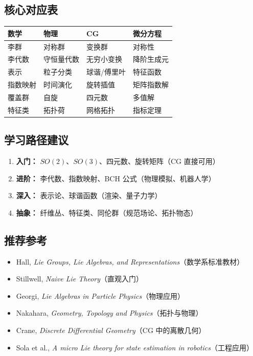 \subsection{核心对应表}

\begin{center}
\begin{tabular}{L{3cm}L{3cm}L{3cm}L{3cm}}
\toprule
\textbf{数学} & \textbf{物理} & \textbf{CG} & \textbf{微分方程} \\
\midrule
李群 & 对称群 & 变换群 & 对称性 \\
李代数 & 守恒量代数 & 无穷小变换 & 降阶生成元 \\
表示 & 粒子分类 & 球谐/傅里叶 & 特征函数 \\
指数映射 & 时间演化 & 旋转插值 & 矩阵指数解 \\
覆盖群 & 自旋 & 四元数 & 多值解 \\
特征类 & 拓扑荷 & 网格拓扑 & 指标定理 \\
\bottomrule
\end{tabular}
\end{center}

\subsection{学习路径建议}

\begin{enumerate}
  \item \textbf{入门：} $SO(2)$、$SO(3)$、四元数、旋转矩阵（CG 直接可用）
  \item \textbf{进阶：} 李代数、指数映射、BCH 公式（物理模拟、机器人学）
  \item \textbf{深入：} 表示论、球谐函数（渲染、量子力学）
  \item \textbf{抽象：} 纤维丛、特征类、同伦群（规范场论、拓扑物态）
\end{enumerate}

\subsection{推荐参考}

\begin{itemize}
  \item Hall, \textit{Lie Groups, Lie Algebras, and Representations}（数学系标准教材）
  \item Stillwell, \textit{Naive Lie Theory}（直观入门）
  \item Georgi, \textit{Lie Algebras in Particle Physics}（物理应用）
  \item Nakahara, \textit{Geometry, Topology and Physics}（拓扑与物理）
  \item Crane, \textit{Discrete Differential Geometry}（CG 中的离散几何）
  \item Sola et al., \textit{A micro Lie theory for state estimation in robotics}（工程应用）
\end{itemize}